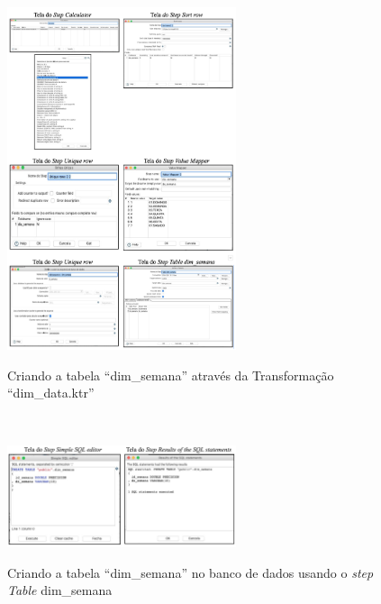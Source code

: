 \begin{figure}[H]
	\vspace*{0,2cm}
    \centering
    \caption{Criando a tabela ``dim\_semana'' atrav\'{e}s da Transforma\c{c}\~{a}o ``dim\_data.ktr''}
    \includegraphics[width=0.6\textwidth]{./04-figuras/figura-dim-semana}
    \label{fig:ilustfigdimsemana}
\end{figure}
\vspace*{-0,9cm}
{\raggedright {}} \\

\begin{figure}[H]
	\vspace*{0,2cm}
    \centering
    \caption{Criando a tabela ``dim\_semana'' no banco de dados usando o \textit{step Table} dim\_semana}
    \includegraphics[width=0.6\textwidth]{./04-figuras/figura-tb-dim-semana}
    \label{fig:ilustfigtbdimsemana}
\end{figure}
\vspace*{-0,9cm}
{\raggedright {}} \\

